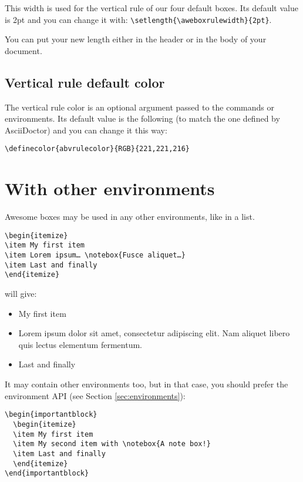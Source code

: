 \documentclass[a4paper,12pt]{article}
\begin{document}
This width is used for the vertical rule of our four default boxes. Its
default value is 2pt and you can change it with:
\verb!\setlength{\aweboxrulewidth}{2pt}!.

You can put your new length either in the header or in the body of your
document.

\subsection{Vertical rule default color}

The vertical rule color is an optional argument passed to the commands
or environments. Its default value is the following (to match the one
defined by AsciiDoctor) and you can change it this way:

\verb!\definecolor{abvrulecolor}{RGB}{221,221,216}!

\section{With other environments}

Awesome boxes may be used in any other environments, like in a list.

\begin{verbatim}
\begin{itemize}
\item My first item
\item Lorem ipsum… \notebox{Fusce aliquet…}
\item Last and finally
\end{itemize}
\end{verbatim}

will give:

\begin{itemize}
\item My first item
\item Lorem ipsum dolor sit amet, consectetur adipiscing elit. Nam
  aliquet libero quis lectus elementum fermentum. 
\item Last and finally
\end{itemize}

It may contain other environments too, but in that case, you should
prefer the environment API (see Section \ref{sec:environments}):

\begin{verbatim}
\begin{importantblock}
  \begin{itemize}
  \item My first item
  \item My second item with \notebox{A note box!}
  \item Last and finally
  \end{itemize}
\end{importantblock}
\end{verbatim}
\end{document}
